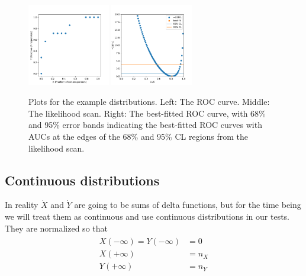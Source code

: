 \documentclass[11pt]{article}
\newcommand{\Xdot}{\dot{X}}
\newcommand{\Ydot}{\dot{Y}}
\begin{document}
\begin{figure}
	\begin{center}
		\includegraphics[width=0.32\textwidth]{discrete_exampleroc.pdf}
		\includegraphics[width=0.32\textwidth]{discrete_scan.pdf}
		\caption{Plots for the example distributions. Left: The ROC curve. Middle: The likelihood scan. Right: The best-fitted ROC curve, with 68\% and 95\% error bands indicating the best-fitted ROC curves with AUCs at the edges of the 68\% and 95\% CL regions from the likelihood scan.}
		\label{fig:exampledata_discrete}
	\end{center}
\end{figure}

\subsection{Continuous distributions}
\label{sec:lagrangian}

In reality \(\Xdot\) and \(\Ydot\) are going to be sums of delta functions, but for the time being we will treat them as continuous and use continuous distributions in our tests.  They are normalized so that
\begin{align}
\begin{aligned}
X(-\infty)=Y(-\infty)&=0 \\
X(+\infty)&=n_X \\
Y(+\infty)&=n_Y
\end{aligned}
\end{align}
\end{document}

